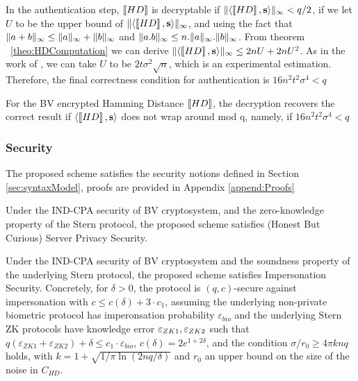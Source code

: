 In the authentication step, \(\left\llbracket HD\right\rrbracket\) is decryptable if \(\Vert \langle \left\llbracket HD\right\rrbracket, \mathbf{s} \rangle \Vert_{\infty} < q/2\), if
we let \(U\) to be the upper bound of \(\Vert \langle \left\llbracket HD\right\rrbracket, \mathbf{s} \rangle \Vert_{\infty}\), and using the fact that
\(\Vert a + b \Vert_{\infty} \leq \Vert a \Vert_{\infty} + \Vert b \Vert_{\infty}\) and \(\Vert a.b \Vert_{\infty} \leq n.\Vert a \Vert_{\infty}.\Vert b \Vert_{\infty}\). From theorem
~\ref{theo:HDComputation} we can derive \(\Vert \langle \left\llbracket HD\right\rrbracket,\mathbf{s} \rangle \Vert_{\infty} \leq 2nU + 2nU^{2}\). As in the
work of \cite{naehrig2011can}, we can take \(U\) to be \(2t \sigma^{2} \sqrt{n}\), which is an experimental
estimation. Therefore, the final correctness condition for authentication is \( 16n^{2}t^{2}\sigma^{4} < q\)
\begin{lemma}
  \label{le:hdcorrectness}
 For the BV encrypted Hamming Distance \(\left\llbracket HD\right\rrbracket\), the decryption recovers the correct result if \(\langle \left\llbracket HD\right\rrbracket,
 \mathbf{s} \rangle\) does not wrap around mod q, namely, if \(16n^{2}t^{2}\sigma^{4} < q\)
\end{lemma}

\subsubsection{Security}
\label{sec:security}
The proposed scheme satisfies the security notions defined in Section \ref{sec:syntaxModel}, proofs are
provided in Appendix \ref{append:Proofs}
\begin{theorem}
  \label{theo:server}
  Under the IND-CPA security of BV cryptosystem, and the zero-knowledge property of the Stern protocol, the proposed
  scheme satisfies (Honest But Curious) Server Privacy Security.
\end{theorem}
\begin{theorem}
  \label{theo:client}
  Under the IND-CPA security of BV cryptosystem and the soundness property of the underlying Stern protocol, the
  proposed scheme satisfies Impersonation Security. Concretely, for $\delta>0$, the protocol is $(q,c)$-secure against
  impersonation with $c \leq c(\delta) + 3 \cdot c_1$, assuming the underlying non-private biometric protocol has
  imperonsation probability $\varepsilon_{bio}$ and the underlying Stern ZK protocols have knowledge error
  $\varepsilon_{ZK1},\varepsilon_{ZK2}$ such that
  $q(\varepsilon_{ZK1}+\varepsilon_{ZK2}) + \delta \leq c_1 \cdot
  \varepsilon_{bio}$, $c(\delta) = 2 e^{1+2\delta}$, and the condition $\sigma/r_0 \geq 4 \pi k n q$ holds, with
  $k = 1 + \sqrt{1/\pi \ln(2nq/\delta)}$ and $r_0$ an upper bound on the size of the noise in $C_{HD}$.
\end{theorem}

